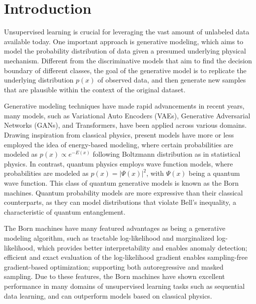 \section{Introduction}

Unsupervised learning is crucial for leveraging the vast amount of unlabeled data available today. One important approach is generative modeling, which aims to model the probability distribution of data given a presumed underlying physical mechanism\cite{lecun2015deep,2019RvMP...91d5002C}. Different from the discriminative models that aim to find the decision boundary of different classes, the goal of the generative model is to replicate the underlying distribution $p(x)$ of observed data, and then generate new samples that are plausible within the context of the original dataset. 

Generative modeling techniques have made rapid advancements in recent years, many models, such as Variational Auto Encoders (VAEs)\cite{2013arXiv1312.6114K}, Generative Adversarial Networks (GANs)\cite{2014arXiv1406.2661G,2018PhRvA..98a2324D}, and Transformers\cite{2017arXiv170603762V}, have been applied across various domains. Drawing inspiration from classical physics, present models have more or less employed the idea of energy-based modeling, where certain probabilities are modeled as $p(x)\propto e^{-E(x)}$ following Boltzmann distribution as in statistical physics\cite{ackley1985learning,salakhutdinov2015learning}. In contrast, quantum physics employs wave function models, where probabilities are modeled as $p(x)=|\Psi(x)|^2$, with $\Psi(x)$ being a quantum wave function. This class of quantum generative models is known as the Born machines\cite{PhysRevX.8.031012, 2022PhRvA.106b2612K, 2021arXiv211205326M}. Quantum probability models are more expressive than their classical counterparts, as they can model distributions that violate Bell’s inequality, a characteristic of quantum entanglement\cite{trueblood2012quantum,haven2016quantum}. 

The Born machines have many featured advantages as being a generative modeling algorithm, such as tractable log-likelihood and marginalized log-likelihood, which provides better interpretability and enables anomaly detection; efficient and exact evaluation of the log-likelihood gradient enables sampling-free gradient-based optimization; supporting both autoregressive and masked sampling. Due to these features, the Born machines have shown excellent performance in many domains of unsupervised learning tasks such as sequential data learning, and can outperform models based on classical physics\cite{2018Entrp..20..583C,2018arXiv180404168L}.

